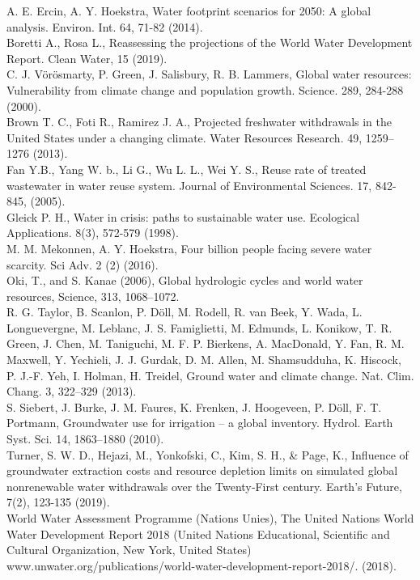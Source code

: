 \documentclass[
  12pt,
]{article}
\begin{document}
A. E. Ercin, A. Y. Hoekstra, Water footprint scenarios for 2050: A
global analysis. Environ. Int. 64, 71-82 (2014).\\
Boretti A., Rosa L., Reassessing the projections of the World Water
Development Report. Clean Water, 15 (2019).\\
C. J. Vörösmarty, P. Green, J. Salisbury, R. B. Lammers, Global water
resources: Vulnerability from climate change and population growth.
Science. 289, 284-288 (2000).\\
Brown T. C., Foti R., Ramirez J. A., Projected freshwater withdrawals in
the United States under a changing climate. Water Resources Research.
49, 1259--1276 (2013).\\
Fan Y.B., Yang W. b., Li G., Wu L. L., Wei Y. S., Reuse rate of treated
wastewater in water reuse system. Journal of Environmental Sciences. 17,
842-845, (2005).\\
Gleick P. H., Water in crisis: paths to sustainable water use.
Ecological Applications. 8(3), 572-579 (1998).\\
M. M. Mekonnen, A. Y. Hoekstra, Four billion people facing severe water
scarcity. Sci Adv. 2 (2) (2016).\\
Oki, T., and S. Kanae (2006), Global hydrologic cycles and world water
resources, Science, 313, 1068--1072.\\
R. G. Taylor, B. Scanlon, P. Döll, M. Rodell, R. van Beek, Y. Wada, L.
Longuevergne, M. Leblanc, J. S. Famiglietti, M. Edmunds, L. Konikow, T.
R. Green, J. Chen, M. Taniguchi, M. F. P. Bierkens, A. MacDonald, Y.
Fan, R. M. Maxwell, Y. Yechieli, J. J. Gurdak, D. M. Allen, M.
Shamsudduha, K. Hiscock, P. J.-F. Yeh, I. Holman, H. Treidel, Ground
water and climate change. Nat. Clim. Chang. 3, 322--329 (2013).\\
S. Siebert, J. Burke, J. M. Faures, K. Frenken, J. Hoogeveen, P. Döll,
F. T. Portmann, Groundwater use for irrigation -- a global inventory.
Hydrol. Earth Syst. Sci. 14, 1863--1880 (2010).\\
Turner, S. W. D., Hejazi, M., Yonkofski, C., Kim, S. H., \& Page, K.,
Influence of groundwater extraction costs and resource depletion limits
on simulated global nonrenewable water withdrawals over the Twenty‐First
century. Earth's Future, 7(2), 123-135 (2019).\\
World Water Assessment Programme (Nations Unies), The United Nations
World Water Development Report 2018 (United Nations Educational,
Scientific and Cultural Organization, New York, United States)
www.unwater.org/publications/world-water-development-report-2018/.
(2018).
\end{document}

